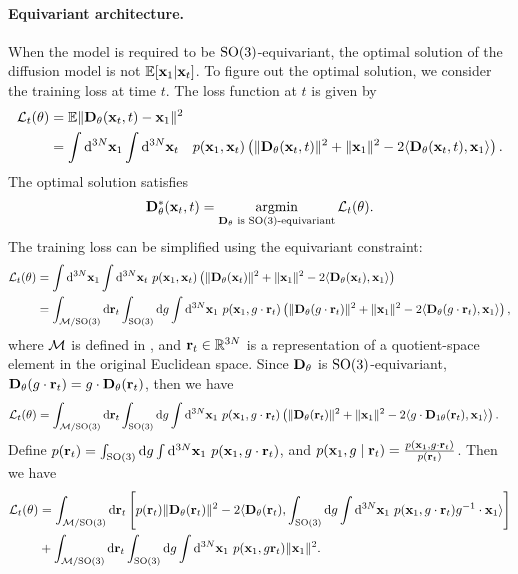 \paragraph{Equivariant architecture.} When the model is required to be $\mathrm{SO}(3)$-equivariant, the optimal solution of the diffusion model is not $\mathbb{E}[\mathbf{x}_1|\mathbf{x}_t]$. To figure out the optimal solution, we consider the training loss at time $t$. The loss function at $t$ is given by
\begin{align}
    \mathcal{L}_t(\theta)&=\mathbb{E}\Vert\mathbf{D}_{\theta}(\mathbf{x}_t,t)-\mathbf{x}_1\Vert^2 \\
    &=\int\mathrm{d}^{3N}\mathbf{x}_1\int\mathrm{d}^{3N}\mathbf{x}_t \quad p(\mathbf{x}_1,\mathbf{x}_t)\left(\Vert\mathbf{D}_{\theta}(\mathbf{x}_t,t)\Vert^2+ \Vert\mathbf{x}_{1}\Vert^2-2\langle\mathbf{D}_{\theta}(\mathbf{x}_t,t),\mathbf{x}_1\rangle\right).
\end{align}
The optimal solution satisfies
\begin{align}
    \mathbf{D}_{\theta}^*(\mathbf{x}_t,t)=\operatorname*{argmin}_{\mathbf{D}_{\theta}  \text{ is $\mathrm{SO}(3)$-equivariant}} \mathcal{L}_t(\theta).
\end{align}
The training loss can be simplified using the equivariant constraint:
\begin{align}
    \mathcal{L}_t(\theta)&=\int\mathrm{d}^{3N}\mathbf{x}_1\int\mathrm{d}^{3N}\mathbf{x}_t ~p(\mathbf{x}_1,\mathbf{x}_t)\left(\Vert\mathbf{D}_{\theta}(\mathbf{x}_t)\Vert^2+ \Vert\mathbf{x}_{1}\Vert^2-2\langle\mathbf{D}_{\theta}(\mathbf{x}_t),\mathbf{x}_1\rangle\right)\\
    &=\int_{\mathcal{M}/\mathrm{SO}(3)} \mathrm{d} \mathbf{r}_t\int_{\mathrm{SO}(3)} \mathrm{d} g \int\mathrm{d}^{3N}\mathbf{x}_1 ~p(\mathbf{x}_1,g\cdot \mathbf{r}_t)\left(\Vert\mathbf{D}_{\theta}(g\cdot \mathbf{r}_t)\Vert^2+ \Vert\mathbf{x}_{1}\Vert^2-2\langle\mathbf{D}_{\theta}(g\cdot \mathbf{r}_t),\mathbf{x}_1\rangle\right),
\end{align}
where $\mathcal{M}$ is defined in , and $\mathbf{r}_t \in \mathbb{R}^{3N}$ is a representation of a quotient-space element in the original Euclidean space.
Since $\mathbf{D}_\theta$ is $\mathrm{SO}(3)$-equivariant, $\mathbf{D}_{\theta}(g\cdot \mathbf{r}_t) = g \cdot \mathbf{D}_{\theta}(\mathbf{r}_t)$, then we have
\begin{align}
    \mathcal{L}_t(\theta)&=\int_{\mathcal{M}/\mathrm{SO}(3)} \mathrm{d} \mathbf{r}_t\int_{\mathrm{SO}(3)} \mathrm{d} g \int\mathrm{d}^{3N}\mathbf{x}_1 ~p(\mathbf{x}_1,g\cdot \mathbf{r}_t)\left(\Vert\mathbf{D}_{\theta}(\mathbf{r}_t)\Vert^2+ \Vert\mathbf{x}_{1}\Vert^2-2\langle g\cdot\mathbf{D}_{1\theta}( \mathbf{r}_t),\mathbf{x}_1\rangle\right).
\end{align}
Define $p(\mathbf{r}_t)=\int_{\mathrm{SO}(3)} \mathrm{d} g \int\mathrm{d}^{3N}\mathbf{x}_1 ~p(\mathbf{x}_1,g\cdot \mathbf{r}_t)$, and $p(\mathbf{x}_1, g\mid \mathbf{r}_t)=\frac{p(\mathbf{x}_1,g\cdot\mathbf{r}_t)}{p(\mathbf{r}_t)}$. Then we have
\begin{align}
    \mathcal{L}_t(\theta)&=\int_{\mathcal{M}/\mathrm{SO}(3)} \mathrm{d} \mathbf{r}_t \left[p(\mathbf{r}_t)\Vert\mathbf{D}_{\theta}(\mathbf{r}_t)\Vert^2 -2\langle \mathbf{D}_{\theta}(\mathbf{r}_t),\int_{\mathrm{SO}(3)} \mathrm{d} g \int\mathrm{d}^{3N}\mathbf{x}_1 ~ p(\mathbf{x}_1,g\cdot \mathbf{r}_t) g^{-1}\cdot\mathbf{x}_1\rangle\right] \\
    &+\int_{\mathcal{M}/\mathrm{SO}(3)} \mathrm{d} \mathbf{r}_t\int_{\mathrm{SO}(3)} \mathrm{d} g \int\mathrm{d}^{3N}\mathbf{x}_1 ~ p(\mathbf{x}_1,g\mathbf{r}_t)\Vert\mathbf{x}_{1}\Vert^2.
\end{align}
